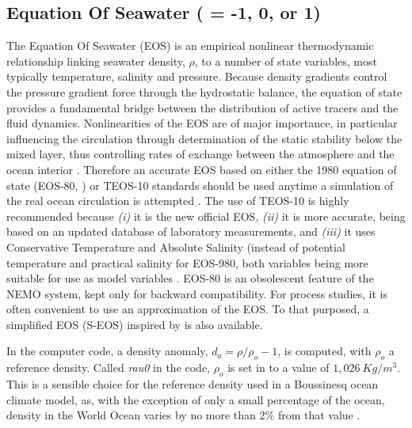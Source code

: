 \documentclass[NEMO_book]{subfiles}
\begin{document}
\subsection{Equation Of Seawater ( = -1, 0, or 1)}
\label{TRA_eos}

The Equation Of Seawater (EOS) is an empirical nonlinear thermodynamic relationship 
linking seawater density, $\rho$, to a number of state variables, 
most typically temperature, salinity and pressure. 
Because density gradients control the pressure gradient force through the hydrostatic balance, 
the equation of state provides a fundamental bridge between the distribution of active tracers 
and the fluid dynamics. Nonlinearities of the EOS are of major importance, in particular 
influencing the circulation through determination of the static stability below the mixed layer, 
thus controlling rates of exchange between the atmosphere  and the ocean interior \citep{Roquet_JPO2015}. 
Therefore an accurate EOS based on either the 1980 equation of state (EOS-80, \cite{UNESCO1983}) 
or TEOS-10 \citep{TEOS10} standards should be used anytime a simulation of the real 
ocean circulation is attempted \citep{Roquet_JPO2015}. 
The use of TEOS-10 is highly recommended because 
\textit{(i)} it is the new official EOS, 
\textit{(ii)} it is more accurate, being based on an updated database of laboratory measurements, and 
\textit{(iii)} it uses Conservative Temperature and Absolute Salinity (instead of potential temperature 
and practical salinity for EOS-980, both variables being more suitable for use as model variables 
\citep{TEOS10, Graham_McDougall_JPO13}. 
EOS-80 is an obsolescent feature of the NEMO system, kept only for backward compatibility.
For process studies, it is often convenient to use an approximation of the EOS. To that purposed, 
a simplified EOS (S-EOS) inspired by \citet{Vallis06} is also available.

In the computer code, a density anomaly, $d_a= \rho / \rho_o - 1$, 
is computed, with $\rho_o$ a reference density. Called \textit{rau0} 
in the code, $\rho_o$ is set in  to a value of $1,026~Kg/m^3$. 
This is a sensible choice for the reference density used in a Boussinesq ocean 
climate model, as, with the exception of only a small percentage of the ocean, 
density in the World Ocean varies by no more than 2$\%$ from that value \citep{Gill1982}.
\end{document}
